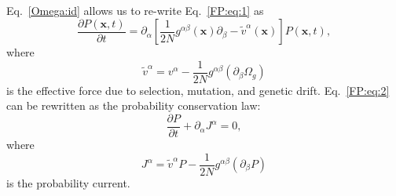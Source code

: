 \documentclass[9pt,twocolumn,twoside]{gsajnl}
\begin{document}
Eq.~\eqref{Omega:id} allows us to re-write Eq.~\eqref{FP:eq:1} as
\begin{equation} \label{FP:eq:2}
\frac{\partial P(\mathbf{x},t)}{\partial t} = \partial_\alpha \left[ \frac{1}{2N} g^{\alpha \beta} (\mathbf{x}) \partial_\beta  - \widetilde{v}^\alpha (\mathbf{x}) \right] P(\mathbf{x},t),
\end{equation}
where
\begin{equation} \label{v:tilde}
\widetilde{v}^\alpha = v^\alpha - \frac{1}{2N} g^{\alpha \beta} (\partial_\beta \Omega_g)
\end{equation}
is the effective force due to selection, mutation, and genetic drift. Eq.~\eqref{FP:eq:2} can be rewritten as the probability conservation law:
\begin{equation} \label{FP:eq:3}
\frac{\partial P}{\partial t} + \partial_\alpha J^\alpha = 0,
\end{equation}
where
\begin{equation} \label{J:cur}
J^\alpha = \tilde{v}^\alpha P - \frac{1}{2N} g^{\alpha \beta} (\partial_\beta P)
\end{equation}
is the probability current. \\
\end{document}
